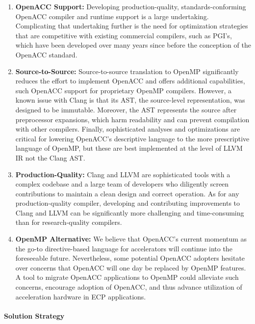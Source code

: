 \begin{enumerate}

\item \textbf{OpenACC Support:} Developing production-quality,
standards-conforming OpenACC compiler and runtime support is a large
undertaking.  Complicating that undertaking further is the need for
optimization strategies that are competitive with existing commercial
compilers, such as PGI's, which have been developed over many years
since before the conception of the OpenACC standard.

\item \textbf{Source-to-Source:} Source-to-source translation to
OpenMP significantly reduces the effort to implement OpenACC and
offers additional capabilities, such OpenACC support for proprietary
OpenMP compilers.  However, a known issue with Clang is that its AST,
the source-level representation, was designed to be immutable.
Moreover, the AST represents the source after preprocessor expansions,
which harm readability and can prevent compilation with other
compilers.  Finally, sophisticated analyses and optimizations are
critical for lowering OpenACC's descriptive language to the more
prescriptive language of OpenMP, but these are best implemented at the
level of LLVM IR not the Clang AST.

\item \textbf{Production-Quality:} Clang and LLVM are sophisticated tools
with a complex codebase and a large team of developers who diligently screen
contributions to maintain a clean design and correct operation.  As for any
production-quality compiler, developing and contributing improvements to
Clang and LLVM can be significantly more challenging and time-consuming than
for research-quality compilers.

\item \textbf{OpenMP Alternative:} We believe that OpenACC's current
momentum as the go-to directive-based language for accelerators will
continue into the foreseeable future.  Nevertheless, some potential OpenACC
adopters hesitate over concerns that OpenACC will one day be replaced by
OpenMP features.  A tool to migrate OpenACC applications to OpenMP could
alleviate such concerns, encourage adoption of OpenACC, and thus advance
utilization of acceleration hardware in ECP applications.

\end{enumerate}

\paragraph{Solution Strategy}

